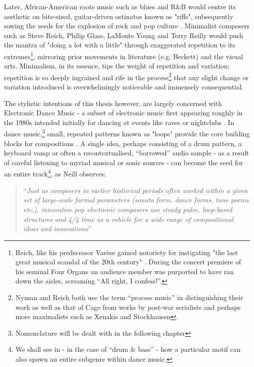 Later, African-American roots music such as blues and R\&B would centre its aesthetic on bite-sized, guitar-driven ostinatos known as "riffs", subsequently sowing the seeds for the explosion of rock and pop culture \citep{Middleton2009, Hatch1987}. Minimalist composers such as Steve Reich, Philip Glass, LaMonte Young and Terry Reilly \citep{Reich2011, Nyman1999} would push the mantra of "doing a lot with a little" through exaggerated repetition to its extremes\footnote{Reich, like his predecessor Varèse gained notoriety for instigating "the last great musical scandal of the 20th century" \citep{ross2007rest}. During the concert premiere of his seminal Four Organs an audience member was purported to have ran down the aisles, screaming “All right, I confess!”.}, mirroring prior movements in literature (e.g. Beckett) and the visual arts. Minimalism, in its essence, tips the weight of repetition and variation; repetition is so deeply ingrained and rife in the process\footnote{Nyman and Reich both use the term ``process music'' in distinguishing their work as well as that of Cage from works by post-war serialists and perhaps more maximalists such as Xenakis and Stockhausen} that any slight change or variation introduced is overwhelmingly noticeable and immensely consequential.

The stylistic intentions of this thesis however, are largely concerned with Electronic Dance Music - a subset of electronic music first appearing roughly in the 1980s intended initially for dancing at events like raves or nightclubs \citep{McLeod2001, Butler2006}. In dance music,\footnote{Nomenclature will be dealt with in the following chapter} small, repeated patterns known as "loops" provide the core building blocks for compositions
	\citep{Neill2002, Patricio2016}. A single idea, perhaps consisting of a drum pattern, a keyboard vamp or often a recontextualised, “borrowed” audio sample - as a result of careful listening to myriad musical or sonic sources - can become the seed for an entire track\footnote{We shall see in  - in the case of ``drum \& bass'' - how a particular motif can also spawn an entire subgenre within dance music.}, as Neill observes:
	
\blockcquote[]{Neill2002}{``\textit{Just as composers in earlier historical periods often worked within a given set of large-scale formal parameters (sonata form, dance forms, tone poems etc.), innovative pop electronic composers use steady pulse, loop-based structures and 4/4 time as a vehicle for a wide range of compositional ideas and innovations}''}	
	
